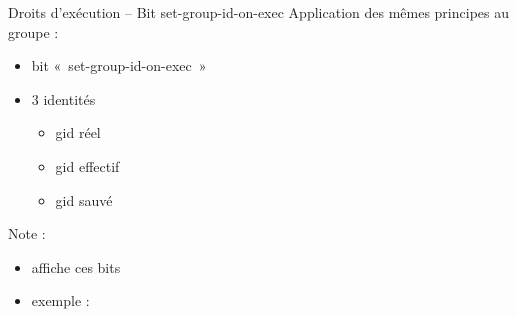\begin {frame} {Droits d'exécution -- Bit set-group-id-on-exec}
    Application des mêmes principes au groupe :

    \begin {itemize}
	\item bit «~set-group-id-on-exec~»
	\item 3 identités
	    \begin {itemize}
		\item gid réel
		\item gid effectif
		\item gid sauvé
	    \end {itemize}
    \end {itemize}

    \vspace* {5mm}
    Note :

    \begin {itemize}
	\item {} affiche ces bits
	\item exemple :

	    \vspace* {1mm}

	    {\fD
	     \\
	     \\
	    }

    \end {itemize}
\end {frame}

